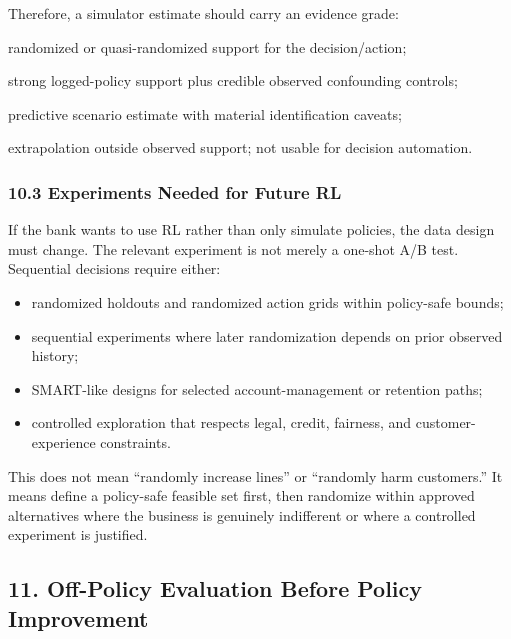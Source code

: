 \documentclass[
]{article}
\providecommand{\tightlist}{%
  \setlength{\itemsep}{0pt}\setlength{\parskip}{0pt}}
\begin{document}
Therefore, a simulator estimate should carry an evidence grade:

\begin{description}[leftmargin=2.1cm,style=nextline]
\item[Grade A] randomized or quasi-randomized support for the decision/action;
\item[Grade B] strong logged-policy support plus credible observed confounding controls;
\item[Grade C] predictive scenario estimate with material identification caveats;
\item[Grade D] extrapolation outside observed support; not usable for decision automation.
\end{description}

\hypertarget{experiments-needed-for-future-rl}{%
\subsubsection{10.3 Experiments Needed for Future
RL}\label{experiments-needed-for-future-rl}}

If the bank wants to use RL rather than only simulate policies, the data
design must change. The relevant experiment is not merely a one-shot A/B
test. Sequential decisions require either:

\begin{itemize}
\tightlist
\item
  randomized holdouts and randomized action grids within policy-safe
  bounds;
\item
  sequential experiments where later randomization depends on prior
  observed history;
\item
  SMART-like designs for selected account-management or retention paths;
\item
  controlled exploration that respects legal, credit, fairness, and
  customer-experience constraints.
\end{itemize}

This does not mean ``randomly increase lines'' or ``randomly harm
customers.'' It means define a policy-safe feasible set first, then
randomize within approved alternatives where the business is genuinely
indifferent or where a controlled experiment is justified.

\hypertarget{off-policy-evaluation-before-policy-improvement}{%
\subsection{11. Off-Policy Evaluation Before Policy
Improvement}\label{off-policy-evaluation-before-policy-improvement}}
\end{document}

